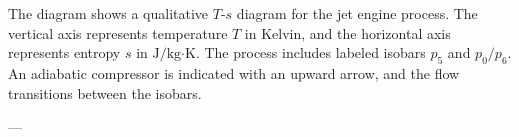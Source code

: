 The diagram shows a qualitative \( T \)-\( s \) diagram for the jet engine process. The vertical axis represents temperature \( T \) in Kelvin, and the horizontal axis represents entropy \( s \) in \( \text{J/kg·K} \). The process includes labeled isobars \( p_5 \) and \( p_0/p_6 \). An adiabatic compressor is indicated with an upward arrow, and the flow transitions between the isobars.  

---